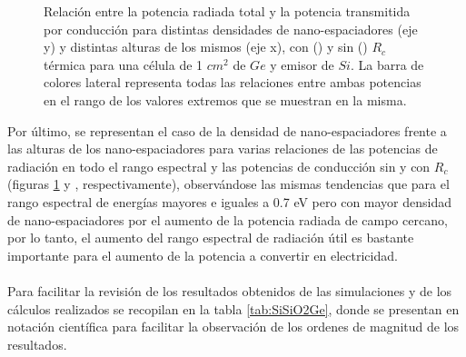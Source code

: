 \begin{figure}[H]
\begin{subfigure}[b]{0.49\textwidth}
		\end{subfigure}
	\caption{\small  Relación entre la potencia radiada total y la potencia transmitida por conducción para distintas densidades de nano-espaciadores (eje y) y distintas alturas de los mismos (eje x), con () y sin () $R_c$ térmica para una célula de 1 $cm^2$ de $Ge$ y emisor de $Si$. La barra de colores lateral representa todas las relaciones entre ambas potencias en el rango de los valores extremos que se muestran en la misma.
	}%
	\label{fig:rels_SiSiO2Ge_full}%
\end{figure}
Por último, se representan el caso de la densidad de nano-espaciadores frente a las alturas de los nano-espaciadores para varias relaciones de las potencias de radiación en todo el rango espectral y las potencias de conducción sin y con $R_c$ (figuras \ref{fig:rels_SiSiO2Ge_full}   y , respectivamente), observándose las mismas tendencias que para el rango espectral de energías mayores e iguales a 0.7 eV pero con mayor densidad de nano-espaciadores por el aumento de la potencia radiada de campo cercano, por lo tanto, el aumento del rango espectral de radiación útil es bastante importante para el aumento de la potencia a convertir en electricidad.\\\\
Para facilitar la revisión de los resultados obtenidos de las simulaciones y de los cálculos realizados se recopilan en la tabla \ref{tab:SiSiO2Ge}, donde se presentan en notación científica para facilitar la observación de los ordenes de magnitud de los resultados.

